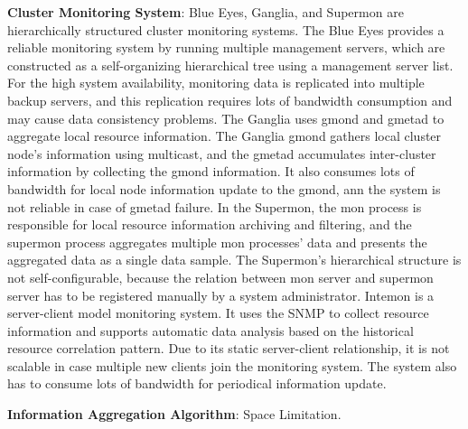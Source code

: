 \documentclass{acm_proc_article-sp}
\begin{document}
\textbf{Cluster Monitoring System}: Blue Eyes\cite{blueeyes}, Ganglia\cite{ganglia}, and Supermon\cite{supermon} are hierarchically structured cluster monitoring systems. 
The Blue Eyes\cite{blueeyes} provides a reliable monitoring system by running multiple management servers, which are constructed as a self-organizing hierarchical tree using a management server list. 
For the high system availability, monitoring data is replicated into multiple backup servers, and this replication requires lots of bandwidth consumption and may cause data consistency problems.
The Ganglia\cite{ganglia} uses gmond and gmetad to aggregate local resource information. 
The Ganglia gmond gathers local cluster node's information using multicast, and the gmetad accumulates inter-cluster information by collecting the gmond information.
It also consumes lots of bandwidth for local node information update to the gmond, ann the system is not reliable in case of gmetad failure.
In the Supermon\cite{supermon}, the mon process is responsible for local resource information archiving and filtering, 
and the supermon process aggregates multiple mon processes' data and presents the aggregated data as a single data sample. 
The Supermon's hierarchical structure is not self-configurable, because the relation between mon server and supermon server has to be registered manually by a system administrator.
Intemon\cite{intemon} is a server-client model monitoring system. It uses the SNMP to collect resource information and supports automatic data analysis based on the historical resource correlation pattern.
Due to its static server-client relationship, it is not scalable in case multiple new clients join the monitoring system. The system also has to consume lots of bandwidth for periodical information update.

\textbf{Information Aggregation Algorithm}: 
Space Limitation. 
\end{document}
